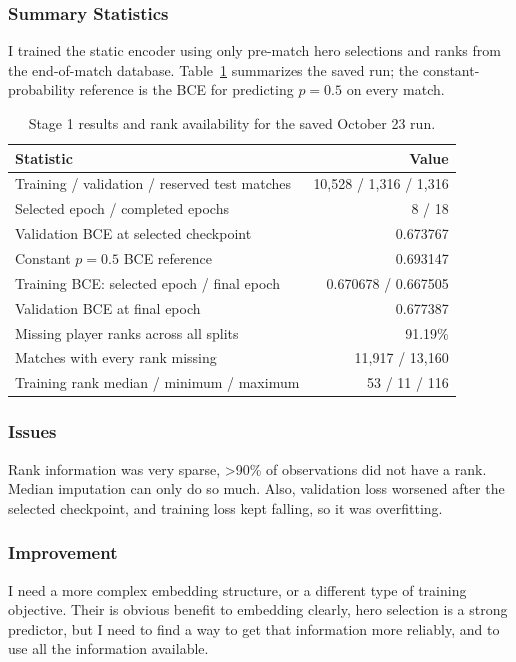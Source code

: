 \documentclass[11pt]{article}
\begin{document}
\subsubsection{Summary Statistics}
    I trained the static encoder using only pre-match hero selections and ranks from the end-of-match database. 
    Table~\ref{tab:static-results} summarizes the saved run; the constant-probability reference is the BCE for
    predicting $p=0.5$ on every match.
    \begin{table}[H]
    \centering
    \small
    \renewcommand{\arraystretch}{1.15}
    \begin{tabularx}{\textwidth}{>{\raggedright\arraybackslash}X r}
    \toprule
    \textbf{Statistic} & \textbf{Value} \\
    \midrule
    Training / validation / reserved test matches & 10,528 / 1,316 / 1,316 \\
    Selected epoch / completed epochs & 8 / 18 \\
    Validation BCE at selected checkpoint & 0.673767 \\
    Constant $p=0.5$ BCE reference & 0.693147 \\
    Training BCE: selected epoch / final epoch & 0.670678 / 0.667505 \\
    Validation BCE at final epoch & 0.677387 \\
    Missing player ranks across all splits & 91.19\% \\
    Matches with every rank missing & 11,917 / 13,160 \\
    Training rank median / minimum / maximum & 53 / 11 / 116 \\
    \bottomrule
    \end{tabularx}
    \caption{Stage 1 results and rank availability for the saved October 23 run.}
    \label{tab:static-results}
    \end{table}

\subsubsection{Issues}
    Rank information was very sparse, >90\% of observations did not have a rank. Median imputation can only do so much. 
    Also, validation loss worsened after the selected checkpoint, and training loss kept falling, so it was overfitting.

\subsubsection{Improvement}
    I need a more complex embedding structure, or a different type of training objective. Their is obvious benefit to embedding 
    clearly, hero selection is a strong predictor, but I need to find a way to get that information more reliably, and to 
    use all the information available.
\end{document}
